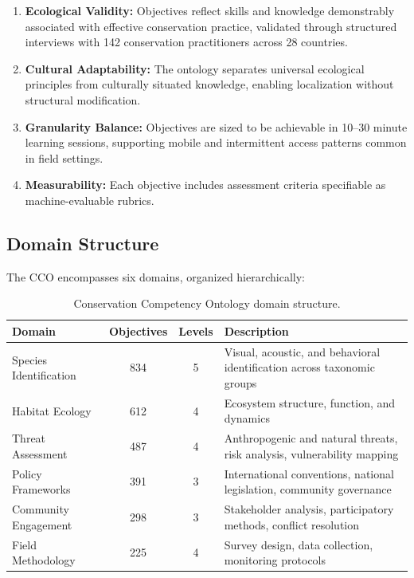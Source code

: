\documentclass[11pt,a4paper]{article}
\begin{document}
\begin{enumerate}[leftmargin=*]
    \item \textbf{Ecological Validity:} Objectives reflect skills and knowledge demonstrably associated with effective conservation practice, validated through structured interviews with 142 conservation practitioners across 28 countries.
    \item \textbf{Cultural Adaptability:} The ontology separates universal ecological principles from culturally situated knowledge, enabling localization without structural modification.
    \item \textbf{Granularity Balance:} Objectives are sized to be achievable in 10--30 minute learning sessions, supporting mobile and intermittent access patterns common in field settings.
    \item \textbf{Measurability:} Each objective includes assessment criteria specifiable as machine-evaluable rubrics.
\end{enumerate}

\subsection{Domain Structure}

The CCO encompasses six domains, organized hierarchically:

\begin{table}[H]
\centering
\caption{Conservation Competency Ontology domain structure.}
\label{tab:cco_domains}
\begin{tabularx}{\textwidth}{@{}lccX@{}}
\toprule
\textbf{Domain} & \textbf{Objectives} & \textbf{Levels} & \textbf{Description} \\
\midrule
Species Identification & 834 & 5 & Visual, acoustic, and behavioral identification across taxonomic groups \\
Habitat Ecology & 612 & 4 & Ecosystem structure, function, and dynamics \\
Threat Assessment & 487 & 4 & Anthropogenic and natural threats, risk analysis, vulnerability mapping \\
Policy Frameworks & 391 & 3 & International conventions, national legislation, community governance \\
Community Engagement & 298 & 3 & Stakeholder analysis, participatory methods, conflict resolution \\
Field Methodology & 225 & 4 & Survey design, data collection, monitoring protocols \\
\bottomrule
\end{tabularx}
\end{table}
\end{document}
